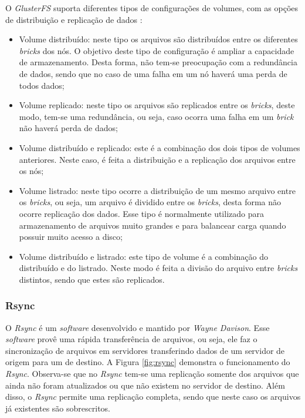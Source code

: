 O \textit{GlusterFS} suporta diferentes tipos de configurações de volumes, com as opções de distribuição e replicação de dados \cite{glusterfs}:
\begin{itemize}
 \item Volume distribuído: neste tipo os arquivos são distribuídos entre os diferentes \textit{bricks} dos nós. O objetivo deste tipo de 
 configuração é ampliar a capacidade de armazenamento. Desta forma, não tem-se preocupação com a redundância de dados, sendo que no caso de uma
 falha em um nó haverá uma perda de todos dados;
 \item Volume replicado: neste tipo os arquivos são replicados entre os \textit{bricks}, deste modo, tem-se uma redundância, ou seja, caso ocorra
 uma falha em um \textit{brick} não haverá perda de dados;
 \item Volume distribuído e replicado: este é a combinação dos dois tipos de volumes anteriores. Neste caso, é feita a distribuição 
 e a replicação dos arquivos entre os nós;
 \item Volume listrado: neste tipo ocorre a distribuição de um mesmo arquivo entre os \textit{bricks}, ou seja, um arquivo é dividido entre os
 \textit{bricks}, desta forma não ocorre replicação dos dados. Esse tipo é normalmente utilizado para armazenamento de arquivos muito grandes 
 e para balancear carga quando possuir muito acesso a disco;
 \item Volume distribuído e listrado: este tipo de volume é a combinação do distribuído e do listrado. Neste modo é feita a divisão do arquivo 
 entre \textit{bricks} distintos, sendo que estes são replicados.
\end{itemize}

\subsubsection{Rsync}
\label{section:rsync}
O \textit{Rsync} \cite{rsync} é um \textit{software} desenvolvido e mantido por \textit{Wayne Davison}. Esse \textit{software} provê uma rápida
transferência de arquivos, ou seja, ele faz o sincronização de arquivos em servidores transferindo dados de um servidor de origem para um de 
destino. A Figura \ref{fig:rsync} demonstra o funcionamento do \textit{Rsync}. Observa-se que no \textit{Rsync} tem-se uma replicação somente dos 
arquivos que ainda não foram atualizados ou que não existem no servidor de destino. Além disso, o \textit{Rsync} permite uma replicação completa, 
sendo que neste caso os arquivos já existentes são sobrescritos.

